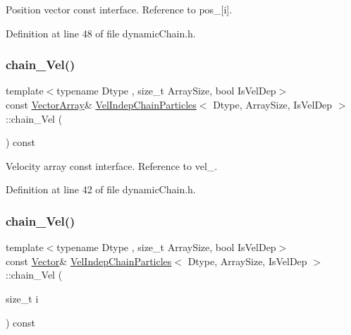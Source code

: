Position vector const interface. Reference to pos\+\_\+\mbox{[}i\mbox{]}. 



Definition at line 48 of file dynamic\+Chain.\+h.

\mbox{\label{class_vel_indep_chain_particles_a22672cce6930aec1555f1f0662d0f52a}} 
\subsubsection{\texorpdfstring{chain_\+Vel()}{chainVel()}\hspace{0.1cm}{\footnotesize\ttfamily [1/2]}}
{\footnotesize\ttfamily template$<$typename Dtype , size\+\_\+t Array\+Size, bool Is\+Vel\+Dep$>$ \\
const \mbox{\hyperlink{class_vel_indep_particles_a27580f65b6523bfb6900520af2e44708}{Vector\+Array}}\& \mbox{\hyperlink{class_vel_indep_chain_particles}{Vel\+Indep\+Chain\+Particles}}$<$ Dtype, Array\+Size, Is\+Vel\+Dep $>$\+::chain_\+Vel (\begin{DoxyParamCaption}{ }\end{DoxyParamCaption}) const\hspace{0.3cm}{\ttfamily [inline]}}



Velocity array const interface. Reference to vel\+\_\+. 



Definition at line 42 of file dynamic\+Chain.\+h.

\mbox{\label{class_vel_indep_chain_particles_a81b2a3bd3f972dd11486beaafa6efc72}} 
\subsubsection{\texorpdfstring{chain_\+Vel()}{chainVel()}\hspace{0.1cm}{\footnotesize\ttfamily [2/2]}}
{\footnotesize\ttfamily template$<$typename Dtype , size\+\_\+t Array\+Size, bool Is\+Vel\+Dep$>$ \\
const \mbox{\hyperlink{class_vel_indep_particles_aa7e03da81f44941c06abf43ec2180079}{Vector}}\& \mbox{\hyperlink{class_vel_indep_chain_particles}{Vel\+Indep\+Chain\+Particles}}$<$ Dtype, Array\+Size, Is\+Vel\+Dep $>$\+::chain_\+Vel (\begin{DoxyParamCaption}\item[{size\+\_\+t}]{i }\end{DoxyParamCaption}) const\hspace{0.3cm}{\ttfamily [inline]}}



